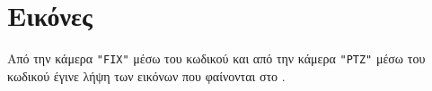 \section{Εικόνες}
Από την κάμερα \texttt{"FIX"} μέσω του κωδικού \IcodeA{}
και από την κάμερα \texttt{"PTZ"} μέσω του κωδικού \IcodeB{}
έγινε λήψη των εικόνων που φαίνονται στο
.
